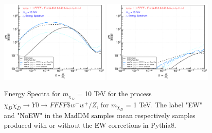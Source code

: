 \documentclass[epj,nopacs,fleqn]{svjour}
\begin{document}
\begin{figure}[!b]
\subfigure
{ \includegraphics[width=0.49\textwidth]{Fig/xdxd_FFFF_WZ/10_neutrinos_mu_FFFF_10.pdf}}
\subfigure
{ \includegraphics[width=0.49\textwidth]{Fig/xdxd_FFFF_WZ/10_neutrinos_tau_FFFF_10.pdf}}
\caption{Energy Spectra for $m_{\chi_D}$ = 10 TeV for the process $\chi_D \chi_D \rightarrow Y0 \rightarrow FFFF \$w^- w^+ /Z $, for $m_{\chi_D}$ = 1 TeV. The label "EW" and "NoEW" in the MadDM samples mean respectively samples produced with or without the EW corrections in Pythia8.}
\label{woff_10}
\end{figure}
\end{document}

